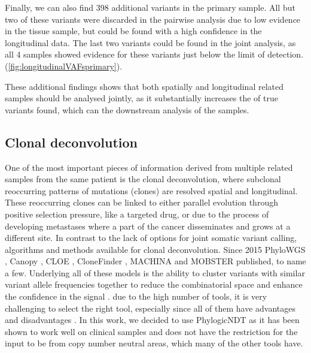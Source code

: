 Finally, we can also find 398 additional variants in the primary sample. All but two of these variants were discarded in the pairwise analysis due to low evidence in the tissue sample, but could be found with a high confidence in the longitudinal data. The last two variants  could be found in the joint analysis, as all 4 samples showed evidence for these variants just below the limit of detection.  (\autoref{fig:longitudinalVAFsprimary}). 

These additional findings shows that both spatially and longitudinal related samples should be analysed jointly, as it substantially increases the  of true variants found, which can  the downstream analysis of the samples.



\subsection[Clonal deconvolution]{Clonal deconvolution}
\label{variantcalling-sec:clonal}

One of the most important pieces of information  derived from multiple related samples from the same patient is the clonal deconvolution, where subclonal reoccurring patterns of mutations (clones) are resolved  spatial and longitudinal. These reoccurring clones can be linked to either parallel evolution through positive selection pressure, like a targeted drug, or due to the process of developing metastases where a part of the cancer disseminates and grows at a different site.
In contrast to the lack of options for joint somatic variant calling,  algorithms and methods  available for clonal deconvolution. Since 2015 PhyloWGS \cite{Deshwar2015}, Canopy \cite{Jiang2016}, CLOE \cite{Marass2016}, CloneFinder \cite{Miura2018}, MACHINA \cite{ElKebir2018} and MOBSTER \cite{Caravagna2020}  published, to name a few. Underlying all of these models is the ability to cluster variants with similar variant allele frequencies together to reduce the combinatorial space and enhance the confidence in the signal \cite{Tarabichi2021}.  due to the high number of tools, it is very challenging to select the right tool, especially since all of them have advantages and disadvantages \cite{Miura2020}. In this work, we decided to use PhylogicNDT \cite{Leshchiner2018} as it has been shown to work well on clinical samples \cite{Gerstung2020} and does not have the restriction for the input to be from copy number neutral areas, which many of the other tools have.


